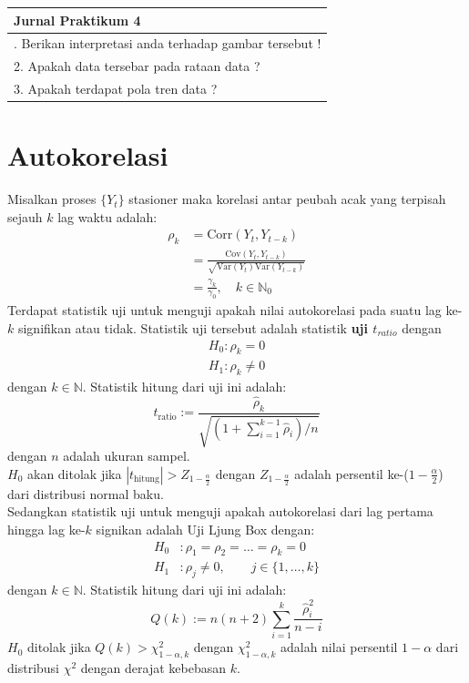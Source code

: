 \documentclass[
]{book}
\begin{document}
\begin{longtable}[]{@{}l@{}}
\toprule\noalign{}
Jurnal Praktikum 4 \\
\midrule\noalign{}
\endhead
\bottomrule\noalign{}
\endlastfoot
1. Berikan interpretasi anda terhadap gambar tersebut ! \\
2. Apakah data tersebar pada rataan data ? \\
3. Apakah terdapat pola tren data ? \\
\end{longtable}

\hypertarget{autokorelasi}{%
\section{Autokorelasi}\label{autokorelasi}}

Misalkan proses \(\{Y_t\}\) stasioner maka korelasi antar peubah acak yang terpisah sejauh \(k\) lag waktu adalah:
\begin{align*}
\rho_k &= \text{Corr}(Y_t, Y_{t-k}) \\
&= \frac{\text{Cov}(Y_t, Y_{t-k})}{\sqrt{\text{Var}(Y_t)\text{Var}(Y_{t-k})}} \\
&= \frac{\gamma_k}{\gamma_0}, \quad k \in \mathbb{N}_0
\end{align*}
Terdapat statistik uji untuk menguji apakah nilai autokorelasi pada suatu lag ke-\(k\) signifikan atau tidak. Statistik uji tersebut adalah statistik \textbf{uji \(t_{ratio}\)} dengan
\begin{align*}
H_0 : \rho_k = 0 \\
H_1 : \rho_k \neq 0 
\end{align*}
dengan \(k \in \mathbb{N}\). Statistik hitung dari uji ini adalah:
\begin{equation}
t_{\text{ratio}} := \frac{\hat{\rho}_k}{\sqrt{\left( 1 + \sum_{i = 1}^{k - 1} \hat{\rho}_i\right)/n}} \label{eq:tratio}
\end{equation}
dengan \(n\) adalah ukuran sampel.\\
\(H_0\) akan ditolak jika \(|t_{\text{hitung}}| > Z_{1-\frac{\alpha}{2}}\) dengan \(Z_{1-\frac{\alpha}{2}}\) adalah persentil ke-(\(1-\frac{\alpha}{2}\)) dari distribusi normal baku.\\
Sedangkan statistik uji untuk menguji apakah autokorelasi dari lag pertama hingga lag ke-\(k\) signikan adalah Uji Ljung Box dengan:
\begin{align*}
H_0 &: \rho_1 = \rho_2 = \dots = \rho_k = 0 \\
H_1 &: \rho_j \neq 0, \quad \quad j \in \{1, \dots, k \} 
\end{align*}
dengan \(k \in \mathbb{N}\). Statistik hitung dari uji ini adalah:
\begin{equation}
Q(k) := n\left(n+2\right)\sum_{i=1}^k \frac{\hat{\rho}_i^2}{n-i} \label{eq:statuji}
\end{equation}
\(H_0\) ditolak jika \(Q(k) > \chi^2_{1-\alpha,k}\) dengan \(\chi^2_{1-\alpha,k}\) adalah nilai persentil \(1-\alpha\) dari distribusi \(\chi^2\) dengan derajat kebebasan \(k\).
\end{document}
